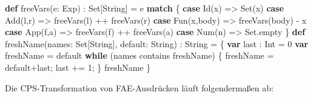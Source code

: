 \documentclass[]{article}
\newenvironment{Shaded}{}{}
\newcommand{\DecValTok}[1]{\textcolor[rgb]{0.25,0.63,0.44}{#1}}
\newcommand{\FunctionTok}[1]{\textcolor[rgb]{0.02,0.16,0.49}{#1}}
\newcommand{\KeywordTok}[1]{\textcolor[rgb]{0.00,0.44,0.13}{\textbf{#1}}}
\newcommand{\NormalTok}[1]{#1}
\begin{document}
\begin{Shaded}
\begin{Highlighting}[]
\KeywordTok{def} \FunctionTok{freeVars}\NormalTok{(e: Exp) : Set[String] =  e }\KeywordTok{match}\NormalTok{ \{}
   \KeywordTok{case} \FunctionTok{Id}\NormalTok{(x) =\textgreater{} Set(x)}
   \KeywordTok{case} \FunctionTok{Add}\NormalTok{(l,r) =\textgreater{} }\FunctionTok{freeVars}\NormalTok{(l) ++ }\FunctionTok{freeVars}\NormalTok{(r)}
   \KeywordTok{case} \FunctionTok{Fun}\NormalTok{(x,body) =\textgreater{} }\FunctionTok{freeVars}\NormalTok{(body) {-} x}
   \KeywordTok{case} \FunctionTok{App}\NormalTok{(f,a) =\textgreater{} }\FunctionTok{freeVars}\NormalTok{(f) ++ }\FunctionTok{freeVars}\NormalTok{(a)}
   \KeywordTok{case} \FunctionTok{Num}\NormalTok{(n) =\textgreater{} Set.}\FunctionTok{empty}
\NormalTok{\}}
\KeywordTok{def} \FunctionTok{freshName}\NormalTok{(names: Set[String], default: String) : String = \{}
  \KeywordTok{var}\NormalTok{ last : Int = }\DecValTok{0}
  \KeywordTok{var}\NormalTok{ freshName = default}
  \KeywordTok{while}\NormalTok{ (names contains freshName) \{ freshName = default+last; last += }\DecValTok{1}\NormalTok{; \}}
\NormalTok{  freshName}
\NormalTok{\}}
\end{Highlighting}
\end{Shaded}

Die CPS-Transformation von FAE-Ausdrücken läuft folgendermaßen ab:
\end{document}
